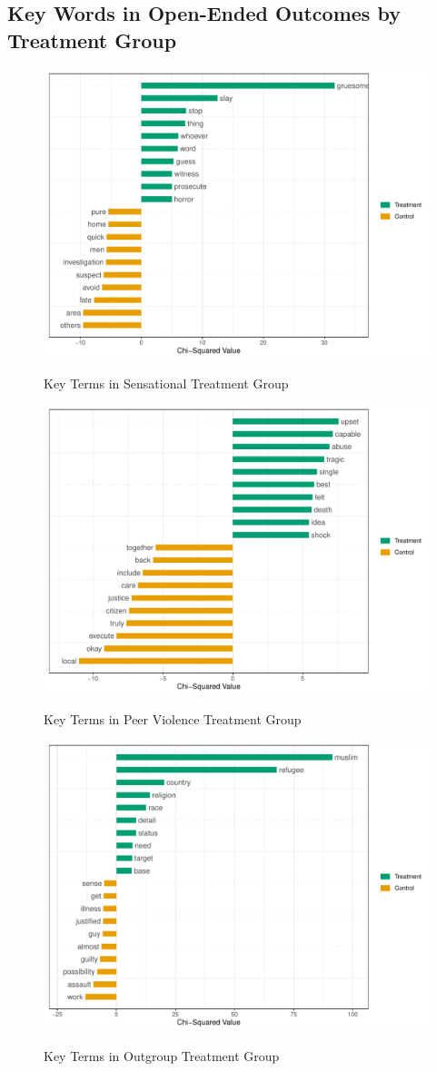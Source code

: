 \documentclass[]{article}
\begin{document}
\subsection{Key Words in Open-Ended Outcomes by Treatment Group}

\begin{figure}[H]
  \caption{Key Terms in Sensational Treatment Group}
  \centering
  \includegraphics[width=.7\textwidth]{figures/keywords_factor_sensational.pdf}\\
\end{figure}

\begin{figure}[H]
  \caption{Key Terms in Peer Violence Treatment Group}
  \centering
  \includegraphics[width=.7\textwidth]{figures/keywords_factor_peer_viol.pdf}\\
\end{figure}

\begin{figure}[H]
  \caption{Key Terms in Outgroup Treatment Group}
  \centering
  \includegraphics[width=.7\textwidth]{figures/keywords_factor_outgroup.pdf}\\
\end{figure}
\end{document}
